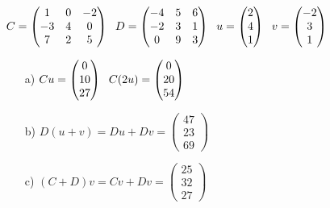 \subsection{}
\begin{math}
    C=\begin{pmatrix}
        1 & 0 & -2\\
        -3 & 4 & 0\\
        7 & 2 & 5
    \end{pmatrix}
    \hspace{6px}
    D=\begin{pmatrix}
        -4 & 5 & 6\\
        -2 & 3 & 1\\
        0 & 9 & 3
    \end{pmatrix}
    \hspace{6px}
    u=\begin{pmatrix}
        2\\
        4\\
        1
    \end{pmatrix}
    \hspace{6px}
    v=\begin{pmatrix}
        -2\\
        3\\
        1
    \end{pmatrix}
\end{math}
\begin{enumerate}
    \item[a)]
        \begin{math}
            Cu
            =\begin{pmatrix}
                0\\
                10\\
                27
            \end{pmatrix}
            \hspace{6px}
            C(2u)
            =\begin{pmatrix}
                0\\
                20\\
                54
            \end{pmatrix}
        \end{math}
    \item[b)]
        \begin{math}
            D(u+v)
            =Du+Dv
            =\begin{pmatrix}
                47\\
                23\\
				69
            \end{pmatrix}
        \end{math}
    \item[c)]
        \begin{math}
			(C+D)v
			=Cv+Dv
			=\begin{pmatrix}
				25\\
				32\\
				27
			\end{pmatrix}
        \end{math}
\end{enumerate}